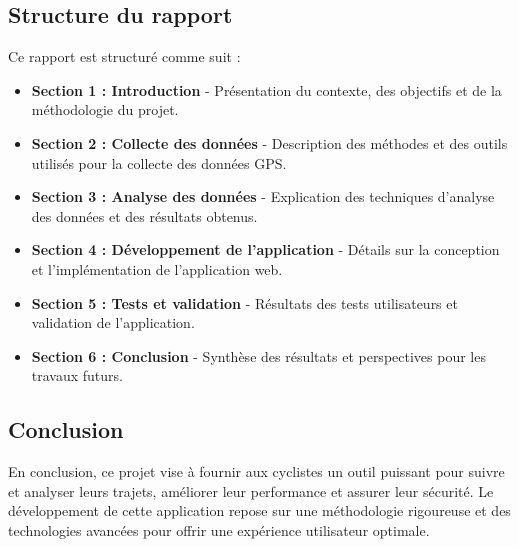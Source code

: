 \subsection{Structure du rapport}

Ce rapport est structuré comme suit :
\begin{itemize}
    \item \textbf{Section 1 : Introduction} - Présentation du contexte, des objectifs et de la méthodologie du projet.
    \item \textbf{Section 2 : Collecte des données} - Description des méthodes et des outils utilisés pour la collecte des données GPS.
    \item \textbf{Section 3 : Analyse des données} - Explication des techniques d'analyse des données et des résultats obtenus.
    \item \textbf{Section 4 : Développement de l'application} - Détails sur la conception et l'implémentation de l'application web.
    \item \textbf{Section 5 : Tests et validation} - Résultats des tests utilisateurs et validation de l'application.
    \item \textbf{Section 6 : Conclusion} - Synthèse des résultats et perspectives pour les travaux futurs.
\end{itemize}

\subsection{Conclusion}

En conclusion, ce projet vise à fournir aux cyclistes un outil puissant pour suivre et analyser leurs trajets, améliorer leur performance et assurer leur sécurité. Le développement de cette application repose sur une méthodologie rigoureuse et des technologies avancées pour offrir une expérience utilisateur optimale.

